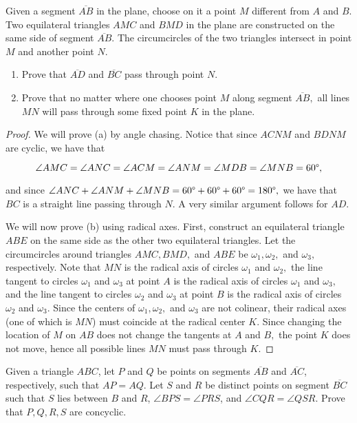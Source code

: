 \documentclass[letterpaper,oneside]{scrartcl}
\providecommand{\ii}{\item}
\begin{document}
\begin{problem*}
  [2.27, BAMO 2012/4]   Given a segment $\overline{AB}$ in the plane, choose on it a point $M$ different from $A$ and $B$. Two equilateral triangles $AMC$ and $BMD$ in the plane are constructed on the same side of segment $\overline{AB}.$ The circumcircles of the two triangles intersect in point $M$ and another point $N.$
  \renewcommand{\labelenumi}{(\alph{enumi})}
  \begin{enumerate}
    \ii Prove that $\overline{AD}$ and $\overline{BC}$ pass through point $N.$

    \ii Prove that no matter where one chooses point $M$ along segment $\overline{AB},$ all lines $MN$ will pass through some fixed point $K$ in the plane.
  \end{enumerate}
\end{problem*}
\begin{proof}  We will prove (a) by angle chasing. Notice that since $ACNM$ and $BDNM$ are cyclic, we have that

  $$\angle AMC = \angle ANC = \angle ACM = \angle ANM = \angle MDB = \angle MNB = 60\degree,$$

  and since $\angle ANC + \angle ANM + \angle MNB = 60\degree + 60\degree + 60\degree = 180\degree,$ we have that $BC$ is a straight line passing through $N.$ A very similar argument follows for $AD.$

  We will now prove (b) using radical axes. First, construct an equilateral triangle $ABE$ on the same side as the other two equilateral triangles. Let the circumcircles around triangles $AMC, BMD,$ and $ABE$ be $\omega_1, \omega_2,$ and $\omega_3,$ respectively. Note that $MN$ is the radical axis of circles $\omega_1$ and $\omega_2,$ the line tangent to circles $\omega_1$ and $\omega_3$ at point $A$ is the radical axis of circles $\omega_1$ and $\omega_3,$ and the line tangent to circles $\omega_2$ and $\omega_3$ at point $B$ is the radical axis of circles $\omega_2$ and $\omega_3.$ Since the centers of  $\omega_1, \omega_2,$ and $\omega_3$ are not colinear, their radical axes (one of which is $MN$) must coincide at the radical center $K.$ Since changing the location of $M$ on $AB$ does not change the tangents at $A$ and $B,$ the point $K$ does not move, hence all possible lines $MN$ must pass through $K.$ \end{proof}



\begin{problem*}
  [2.28, JMO 2012/1]
  Given a triangle $ABC$, let $P$ and $Q$ be points on segments $\overline{AB}$ and $\overline{AC}$, respectively, such that $AP = AQ.$ Let $S$ and $R$ be distinct points on segment $\overline{BC}$ such that $S$ lies between $B$ and $R$, $\angle BPS = \angle PRS$, and $\angle CQR = \angle QSR$. Prove that $P, Q, R, S$ are concyclic.
\end{problem*}
\end{document}
